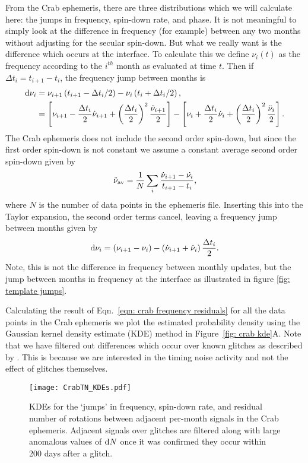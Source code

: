 \documentclass[../full_thesis/full_thesis.tex]{subfiles}
\begin{document}
From the Crab ephemeris, there are three distributions which we will calculate
here: the jumps in frequency, spin-down rate, and phase. It is not meaningful
to simply look at the difference in frequency (for example) between any two
months without adjusting for the secular spin-down. But what we really want is the
difference which occurs at the interface. To calculate this we define
$\nu_{i}(t)$ as the frequency according to the $i^{th}$ month as evaluated at
time $t$. Then if $\Delta t_{i} = t_{i+1} - t_{i}$, the frequency jump between
months is
\begin{align}
\mathrm{d}\nu_{i} &= \nu_{i+1}\left(t_{i+1}-\Delta t_{i}/2\right) -  \nu_{i}\left(t_{i}+\Delta t_{i}/2\right), \\
    &= \left[\nu_{i+1}- \frac{\Delta t_{i}}{2}\dot{\nu}_{i+1} + \left(\frac{\Delta t_{i}}{2}\right)^{2}\frac{\ddot{\nu}_{i+1}}{2}\right]
     - \left[\nu_{i} + \frac{\Delta t_{i}}{2}\dot{\nu}_{i}+ \left(\frac{\Delta t_{i}}{2}\right)^{2}\frac{\ddot{\nu}_{i}}{2}\right] .
\end{align}
The Crab ephemeris does not include the second order spin-down, but since the
first order spin-down is not constant we assume a constant average second order
spin-down given by
\begin{equation}
   \ddot{\nu}_{\textrm{av}} = \frac{1}{N}\sum_{i} \frac{\dot{\nu}_{i+1} - \dot{\nu_{i}}}{t_{i+1} - t_{i}},
   \label{eqn: average second order spin-down}
\end{equation}
where $N$ is the number of data points in the ephemeris file. Inserting this
into the Taylor expansion, the second order terms cancel, leaving a frequency
jump between months given by
\begin{equation}
\mathrm{d}\nu_{i} = \left(\nu_{i+1}- \nu_{i}\right) -  \left(\dot{\nu}_{i+1}
               + \dot{\nu}_{i}\right)\frac{\Delta t_{i}}{2}.
\label{eqn: crab frequency residuals}
\end{equation}
Note, this is not the difference in frequency between monthly
updates, but the jump between months in frequency at the interface as illustrated in figure
\ref{fig: template jumps}.

Calculating the result of Eqn.~\eqref{eqn: crab frequency residuals} for all
the data points in the Crab ephemeris we plot the estimated probability density using the
Gaussian kernel density estimate (KDE) method \citep{Scipy} in Figure~\ref{fig:
crab kde}A. Note that we have filtered out differences which occur over known
glitches as described by \citet{Espinoza2011}. This is because we are
interested in the timing noise activity and not the effect of glitches
themselves.
\begin{figure}[ht]
\centering
\texttt{[image: CrabTN\_KDEs.pdf]}
\caption{KDEs for the `jumps' in frequency, spin-down rate, and residual number
of rotations between adjacent per-month signals in the Crab ephemeris.
Adjacent signals over glitches are filtered along with large anomalous values
of $\mathrm{d} N$ once it was confirmed they occur within 200 days after a glitch.}
\label{fig: crab kde}
\end{figure}
\end{document}
